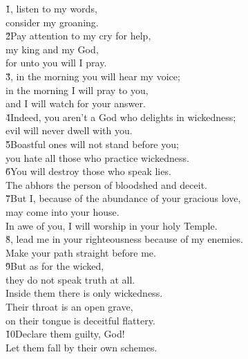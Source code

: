 \begin{poetry}
\poeml \v{1}, listen to my words, \\
\poemll    consider my groaning. \\
\poeml \v{2}Pay attention to my cry for help, \\
\poemll    my king and my God, \\
\poemlll       for unto you will I pray. \\
\poeml \v{3}, in the morning you will hear my voice; \\
\poemll    in the morning I will pray to you, \\
\poemll    and I will watch for your answer. \\
\poeml \v{4}Indeed, you aren't a God who delights in wickedness; \\
\poemll    evil will never dwell with you. \\
\poeml \v{5}Boastful ones will not stand before you; \\
\poemll    you hate all those who practice wickedness. \\
\poeml \v{6}You will destroy those who speak lies. \\
\poemll    The  abhors the person of bloodshed and deceit. \\
\poeml \v{7}But I, because of the abundance of your gracious love, \\
\poemll    may come into your house. \\
\poemlll       In awe of you, I will worship in your holy Temple. \\
\poeml \v{8}, lead me in your righteousness because of my enemies. \\
\poemll    Make your path straight before me. \\
\poeml \v{9}But as for the wicked, \\
\poemll    they do not speak truth at all. \\
\poemlll       Inside them there is only wickedness. \\
\poeml Their throat is an open grave, \\
\poemll    on their tongue is deceitful flattery. \\
\poeml \v{10}Declare them guilty, God! \\
\poemll    Let them fall by their own schemes. \\

\end{poetry}
